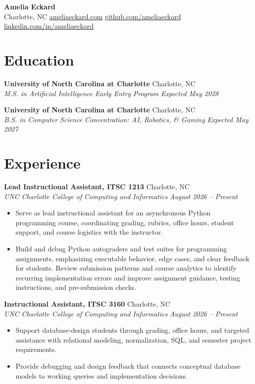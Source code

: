 \documentclass[letterpaper,10pt]{article}
\newcommand{\resumeentry}[4]{
  \noindent\textbf{#1} \hfill #2 \\
  \textit{#3} \hfill \textit{#4}
}
\begin{document}
\begin{center}
  {\Large\textbf{Amelia Eckard}} \\[3pt]
  Charlotte, NC \textbar{}
  \href{https://ameliaeckard.com}{ameliaeckard.com} \textbar{}
  \href{https://github.com/ameliaeckard}{github.com/ameliaeckard} \textbar{}
  \href{https://linkedin.com/in/ameliaeckard}{linkedin.com/in/ameliaeckard}
\end{center}

\section{Education}

\resumeentry
  {University of North Carolina at Charlotte}{Charlotte, NC}
  {M.S. in Artificial Intelligence \textbar{} Early Entry Program}{Expected May 2028}

\smallskip

\resumeentry
  {University of North Carolina at Charlotte}{Charlotte, NC}
  {B.S. in Computer Science \textbar{} Concentration: AI, Robotics, \& Gaming}{Expected May 2027}

\section{Experience}

\resumeentry
  {Lead Instructional Assistant, ITSC 1213}{Charlotte, NC}
  {UNC Charlotte College of Computing and Informatics}{August 2026 -- Present}
\begin{itemize}
  \item Serve as lead instructional assistant for an asynchronous Python programming course, coordinating grading, rubrics, office hours, student support, and course logistics with the instructor.
  \item Build and debug Python autograders and test suites for programming assignments, emphasizing executable behavior, edge cases, and clear feedback for students. Review submission patterns and course analytics to identify recurring implementation errors and improve assignment guidance, testing instructions, and pre-submission checks.
\end{itemize}

\smallskip

\resumeentry
  {Instructional Assistant, ITSC 3160}{Charlotte, NC}
  {UNC Charlotte College of Computing and Informatics}{August 2026 -- Present}
\begin{itemize}
  \item Support database-design students through grading, office hours, and targeted assistance with relational modeling, normalization, SQL, and semester project requirements.
  \item Provide debugging and design feedback that connects conceptual database models to working queries and implementation decisions.
\end{itemize}
\end{document}
